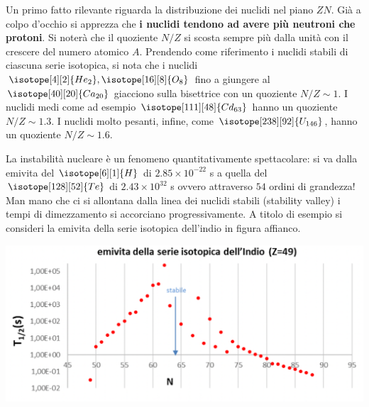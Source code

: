 
Un primo fatto rilevante riguarda la distribuzione dei nuclidi nel piano $ ZN $.
Già a colpo d’occhio si apprezza che \textbf{i nuclidi tendono ad avere più neutroni che protoni}.
Si noterà che il quoziente $N/Z$ si scosta sempre più dalla unità con il crescere del numero atomico $A$.
Prendendo come riferimento i nuclidi stabili di ciascuna serie isotopica, si nota che i nuclidi
$ \isotope[4][2]{\mathlarger{He}_{2}} , \isotope[16][8]{\mathlarger{O}_{8}}$ fino a giungere al
$ \isotope[40][20]{\mathlarger{Ca}_{20}} $ giacciono sulla bisettrice con un quoziente $N/Z \sim 1$.
I nuclidi medi come ad esempio $ \isotope[111][48]{\mathlarger{Cd}_{63}} $ hanno un quoziente $N/Z \sim 1.3$.
I nuclidi molto pesanti, infine, come $ \isotope[238][92]{\mathlarger{U}_{146}} $, hanno un quoziente $N/Z \sim 1.6$.


La instabilità nucleare è un fenomeno quantitativamente spettacolare: si va dalla emivita del $ \isotope[6][1]{\mathlarger{H}}
$ di $2.85 \times 10^{-22}$ s a quella del $ \isotope[128][52]{\mathlarger{Te}} $ di $ 2.43 \times 10^{32} $ s ovvero
attraverso $54$ ordini di grandezza!
Man mano che ci si allontana dalla linea dei nuclidi stabili (stability valley) i tempi di dimezzamento si accorciano
progressivamente.
A titolo di esempio si consideri la emivita della serie isotopica dell’indio in figura affianco.

\begin{marginfigure}
    \centering
    \includegraphics[width = 1.35 \textwidth,scale = 1.5]{../figs/emivita-indio}
    \label{fig:emivita-indio}
\end{marginfigure}

